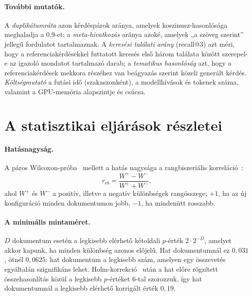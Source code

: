 \paragraph{További mutatók.} A \emph{duplikátumráta} azon kérdéspárok aránya, amelyek
koszinusz-hasonlósága meghaladja a 0,9-et; a \emph{meta-hivatkozás} aránya azoké, amelyek „a szöveg
szerint” jellegű fordulatot tartalmaznak. A \emph{keresési találati arány} (recall@3) azt méri, hogy a
referenciakérdésekkel futtatott keresés első három találata között szerepel-e az igazoló mondatot
tartalmazó darab; a \emph{tematikus hasonlóság} azt, hogy a referenciakérdések mekkora részéhez van
beágyazás szerint közeli generált kérdés. \emph{Költségmutató} a futási idő (szakaszonként), a
modellhívások és tokenek száma, valamint a GPU-memória alapszintje és csúcsa.

\section{A statisztikai eljárások részletei}
\label{app-statisztika}

\paragraph{Hatásnagyság.} A páros Wilcoxon-próba~\cite{wilcoxon1945} mellett a hatás nagysága a
rangbiszeriális korreláció~\cite{kerby2014}:
\begin{equation}
r_{rb}=\frac{W^{+}-W^{-}}{W^{+}+W^{-}},
\label{eq:rrb}
\end{equation}
ahol $W^{+}$ és $W^{-}$ a pozitív, illetve a negatív különbségek rangösszege; $+1$, ha az új
konfiguráció minden dokumentumon jobb, $-1$, ha mindenütt rosszabb.

\paragraph{A minimális mintaméret.} $D$ dokumentum esetén a legkisebb elérhető kétoldali $p$-érték
$2\cdot 2^{-D}$, amelyet akkor kapunk, ha minden különbség azonos előjelű. Hat dokumentumnál ez $0{,}031$,
ötnél $0{,}0625$: hat dokumentum a legkisebb szám, amelyen egy összevetés egyáltalán szignifikáns
lehet. Holm-korrekció~\cite{holm1979} után a hat előre rögzített összehasonlítás közül a legkisebb
$p$-értéket 6-tal szorozzuk, így hat dokumentumnál a legkisebb elérhető korrigált érték $0{,}19$.

